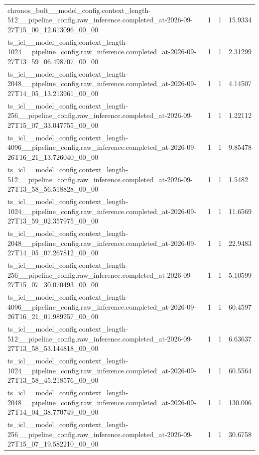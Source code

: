 \begin{tabular}{llll}
chronos\_bolt\_\_model\_config.context\_length-512\_\_pipeline\_config.raw\_inference.completed\_at-2026-09-27T15\_00\_12.613096\_00\_00 & 1 & 1 & 15.9334 \\
ts\_icl\_\_model\_config.context\_length-1024\_\_pipeline\_config.raw\_inference.completed\_at-2026-09-27T13\_59\_06.498707\_00\_00 & 1 & 1 & 2.31299 \\
ts\_icl\_\_model\_config.context\_length-2048\_\_pipeline\_config.raw\_inference.completed\_at-2026-09-27T14\_05\_13.213961\_00\_00 & 1 & 1 & 4.14507 \\
ts\_icl\_\_model\_config.context\_length-256\_\_pipeline\_config.raw\_inference.completed\_at-2026-09-27T15\_07\_33.047755\_00\_00 & 1 & 1 & 1.22112 \\
ts\_icl\_\_model\_config.context\_length-4096\_\_pipeline\_config.raw\_inference.completed\_at-2026-09-26T16\_21\_13.726040\_00\_00 & 1 & 1 & 9.85478 \\
ts\_icl\_\_model\_config.context\_length-512\_\_pipeline\_config.raw\_inference.completed\_at-2026-09-27T13\_58\_56.518828\_00\_00 & 1 & 1 & 1.5482 \\
ts\_icl\_\_model\_config.context\_length-1024\_\_pipeline\_config.raw\_inference.completed\_at-2026-09-27T13\_59\_02.357975\_00\_00 & 1 & 1 & 11.6569 \\
ts\_icl\_\_model\_config.context\_length-2048\_\_pipeline\_config.raw\_inference.completed\_at-2026-09-27T14\_05\_07.267812\_00\_00 & 1 & 1 & 22.9483 \\
ts\_icl\_\_model\_config.context\_length-256\_\_pipeline\_config.raw\_inference.completed\_at-2026-09-27T15\_07\_30.070493\_00\_00 & 1 & 1 & 5.10599 \\
ts\_icl\_\_model\_config.context\_length-4096\_\_pipeline\_config.raw\_inference.completed\_at-2026-09-26T16\_21\_01.989257\_00\_00 & 1 & 1 & 60.4597 \\
ts\_icl\_\_model\_config.context\_length-512\_\_pipeline\_config.raw\_inference.completed\_at-2026-09-27T13\_58\_53.144818\_00\_00 & 1 & 1 & 6.63637 \\
ts\_icl\_\_model\_config.context\_length-1024\_\_pipeline\_config.raw\_inference.completed\_at-2026-09-27T13\_58\_45.218576\_00\_00 & 1 & 1 & 60.5564 \\
ts\_icl\_\_model\_config.context\_length-2048\_\_pipeline\_config.raw\_inference.completed\_at-2026-09-27T14\_04\_38.770749\_00\_00 & 1 & 1 & 130.006 \\
ts\_icl\_\_model\_config.context\_length-256\_\_pipeline\_config.raw\_inference.completed\_at-2026-09-27T15\_07\_19.582210\_00\_00 & 1 & 1 & 30.6758 \\

\end{tabular}
